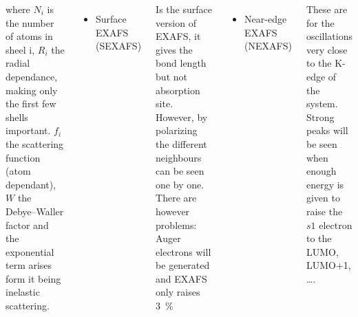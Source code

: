 \begin{columns}
{where $N_{i}$ is the number of atoms in sheel i, $R_{i}$ the radial dependance, making only the first few shells important. $f_{i}$ the scattering function (atom dependant), $W$ the Debye--Waller factor and the exponential term arises form it being inelastic scattering.
\begin{itemize}\item{Surface EXAFS (SEXAFS)}\end{itemize}
Is the surface version of EXAFS, it gives the bond length but not absorption site. However, by polarizing the different neighbours can be seen one by one. There are however problems: Auger electrons will be generated and EXAFS only raises \SI{3}{\percent} 
\begin{itemize}\item{Near-edge EXAFS (NEXAFS)}\end{itemize}
These are for the oscillations very close to the K-edge of the system. Strong peaks will be seen when enough energy is given to raise the $s1$ electron to the LUMO, LUMO+1, \dots.
        }
\end{columns}


